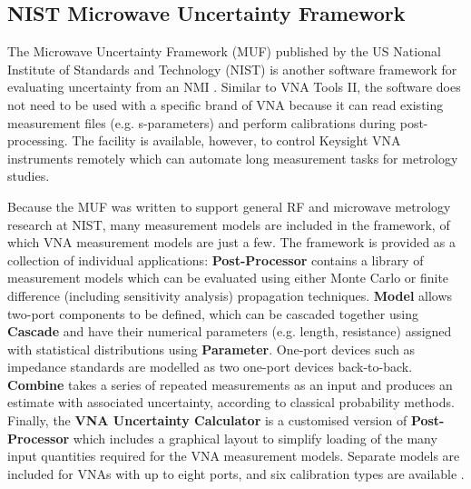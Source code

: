 \documentclass[../thesis/thesis.tex]{subfiles}
\begin{document}
\begin{refsection}
\subsection{NIST Microwave Uncertainty Framework}

The Microwave Uncertainty Framework (MUF) published by the US National Institute of Standards and Technology (NIST) is another software framework for evaluating uncertainty from an NMI \cite{MUFWebsite, Ginley_2016, Ginley_2017}. Similar to VNA Tools II, the software does not need to be used with a specific brand of VNA because it can read existing measurement files (e.g. s-parameters) and perform calibrations during post-processing. The facility is available, however, to control Keysight VNA instruments remotely which can automate long measurement tasks for metrology studies.

Because the MUF was written to support general RF and microwave metrology research at NIST, many measurement models are included in the framework, of which VNA measurement models are just a few. The framework is provided as a collection of individual applications: \textbf{Post-Processor} contains a library of measurement models which can be evaluated using either Monte Carlo or finite difference (including sensitivity analysis) propagation techniques. \textbf{Model} allows two-port components to be defined, which can be cascaded together using \textbf{Cascade} and have their numerical parameters (e.g. length, resistance) assigned with statistical distributions using \textbf{Parameter}. One-port devices such as impedance standards are modelled as two one-port devices back-to-back. \textbf{Combine} takes a series of repeated measurements as an input and produces an estimate with associated uncertainty, according to classical probability methods. Finally, the \textbf{VNA Uncertainty Calculator} is a customised version of \textbf{Post-Processor} which includes a graphical layout to simplify loading of the many input quantities required for the VNA measurement models. Separate models are included for VNAs with up to eight ports, and six calibration types are available \cite{Jargon_2019}.


\end{refsection}
\end{document}
